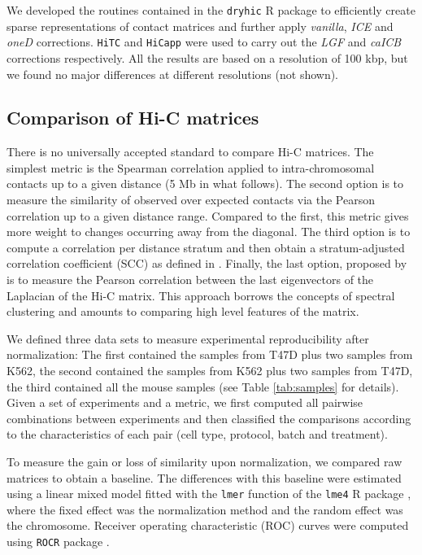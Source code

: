 \documentclass{bioinfo}
\begin{document}
\begin{methods}
We developed the routines contained in the \texttt{dryhic} R package to
efficiently create sparse representations of contact matrices and further
apply \textit{vanilla}, \textit{ICE} and \textit{oneD} corrections.
\texttt{HiTC} \citep{servant2012hitc} and \texttt{HiCapp}
\citep{wu2016computational} were used to carry out the \textit{LGF} and
\textit{caICB} corrections respectively. All the results are based on a
resolution of 100 kbp, but we found no major differences at different
resolutions (not shown).



\subsection{Comparison of Hi-C matrices}
\label{sec:comp}

There is no universally accepted standard to compare Hi-C matrices. The
simplest metric is the Spearman correlation applied to intra-chromosomal
contacts up to a given distance (5 Mb in what follows). The second option
is to measure the similarity of observed over expected contacts via the
Pearson correlation up to a given distance range. Compared to the first,
this metric gives more weight to changes occurring away from the diagonal.
The third option is to compute a correlation per distance stratum and then
obtain a stratum-adjusted correlation coefficient (SCC) as defined in
\cite{yang2017hicrep}. Finally, the last option, proposed by
\cite{yan2017hicspector} is to measure the Pearson correlation between the
last eigenvectors of the Laplacian of the Hi-C matrix. This approach
borrows the concepts of spectral clustering \citep{von2007tutorial} and
amounts to comparing high level features of the matrix.

We defined three data sets to measure experimental reproducibility after
normalization: The first contained the samples from T47D plus two samples
from K562, the second contained the samples from K562 plus two samples
from T47D, the third contained all the mouse samples (see Table
\ref{tab:samples} for details). Given a set of experiments and a metric,
we first computed all pairwise combinations between experiments and then
classified the comparisons according to the characteristics of each pair
(cell type, protocol, batch and treatment).

To measure the gain or loss of similarity upon normalization, we compared
raw matrices to obtain a baseline. The differences with this baseline were
estimated using a linear mixed model fitted with the \texttt{lmer}
function of the \texttt{lme4} R package \citep{bates2015lme4}, where the
fixed effect was the normalization method and the random effect was the
chromosome. Receiver operating characteristic (ROC) curves were computed
using \texttt{ROCR} package \citep{sing2005rocr}.



\end{methods}
\end{document}
